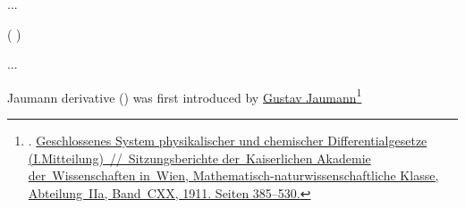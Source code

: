 ...

 
(  )

...

Jaumann derivative () was first introduced by \href{https://en.wikipedia.org/wiki/Gustav_Jaumann}{Gustav Jaumann}\footnote{%
. \href{http://www.physikdidaktik.uni-karlsruhe.de/download/jaumann_1911.pdf}{Geschlossenes System phy\-si\-ka\-li\-scher und che\-mi\-scher Differential\-gesetze (I.\;Mit\-teilung)~//~Sitzungs\-berichte der~Kaiser\-lichen Akademie der~Wissen\-schaften in~Wien, Mathematisch\hbox{-}naturwissenschaftliche Klasse, Abteilung~IIa, Band~CXX, 1911. Seiten 385\hbox{--}530.}}


